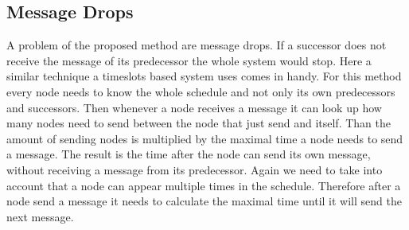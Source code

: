\subsection{Message Drops}
A problem of the proposed method are message drops. If a successor does not receive the message of its predecessor the whole system would stop. Here a similar technique a timeslots based system uses comes in handy. For this method every node needs to know the whole schedule and not only its own predecessors and successors. Then whenever a node receives a message it can look up how many nodes need to send between the node that just send and itself. Than the amount of sending nodes is multiplied by the maximal time a node needs to send a message. The result is the time after the node can send its own message, without receiving a message from its predecessor. Again we need to take into account that a node can appear multiple times in the schedule. Therefore after a node send a message it needs to calculate the maximal time until it will send the next message.
